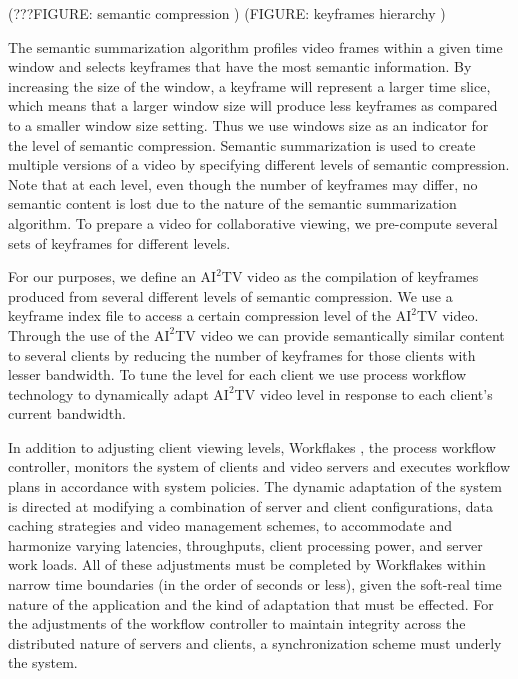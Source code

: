 \documentclass{sig-alternate}
\begin{document}
(???FIGURE: semantic compression )
(FIGURE: keyframes hierarchy )

The semantic summarization algorithm profiles video frames within a
given time window and selects keyframes that have the most semantic
information.  By increasing the size of the window, a keyframe will
represent a larger time slice, which means that a larger window size
will produce less keyframes as compared to a smaller window size
setting.  Thus we use windows size as an indicator for the level of
semantic compression.  Semantic summarization is used to create
multiple versions of a video by specifying different levels of
semantic compression.  Note that at each level, even though the number
of keyframes may differ, no semantic content is lost due to the nature
of the semantic summarization algorithm.  To prepare a video for
collaborative viewing, we pre-compute several sets of keyframes for
different levels.

For our purposes, we define an $\mathrm{AI}^2$TV video as the
compilation of keyframes produced from several different levels of
semantic compression.  We use a keyframe index file to access a
certain compression level of the $\mathrm{AI}^2$TV video.  Through the
use of the $\mathrm{AI}^2$TV video we can provide semantically similar
content to several clients by reducing the number of keyframes for
those clients with lesser bandwidth.  To tune the level for each
client we use process workflow technology to dynamically adapt
$\mathrm{AI}^2$TV video level in response to each client's current
bandwidth.

In addition to adjusting client viewing levels, Workflakes
\cite{PEPPO}, the process workflow controller, monitors the system of
clients and video servers and executes workflow plans in accordance
with system policies.  The dynamic adaptation of the system is
directed at modifying a combination of server and client
configurations, data caching strategies and video management schemes,
to accommodate and harmonize varying latencies, throughputs, client
processing power, and server work loads. All of these adjustments must
be completed by Workflakes within narrow time boundaries (in the order
of seconds or less), given the soft-real time nature of the
application and the kind of adaptation that must be effected.  For the
adjustments of the workflow controller to maintain integrity across
the distributed nature of servers and clients, a synchronization
scheme must underly the system.
\end{document}
